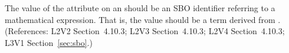 The value of the  attribute on an \InitialAssignment should be an
SBO identifier referring to a mathematical expression.  That is, the value
should be a term derived from \sbomathformula.  (References: L2V2 Section~4.10.3;
L2V3 Section~4.10.3; L2V4 Section~4.10.3; L3V1 Section~\ref{sec:sbo}.)
